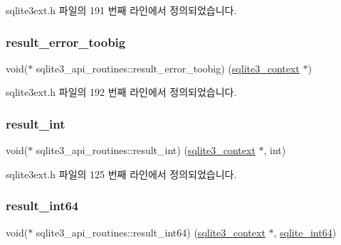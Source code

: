 sqlite3ext.\+h 파일의 191 번째 라인에서 정의되었습니다.

\mbox{\label{structsqlite3__api__routines_a8d8d0f8b76631dc4c976caf8e4b69714}} 
\subsubsection{\texorpdfstring{result\+\_\+error\+\_\+toobig}{result\_error\_toobig}}
{\footnotesize\ttfamily void($\ast$ sqlite3\+\_\+api\+\_\+routines\+::result\+\_\+error\+\_\+toobig) (\hyperlink{sqlite3_8h_a3b519553ffec8fc42b2356f5b1ebdc57}{sqlite3\+\_\+context} $\ast$)}



sqlite3ext.\+h 파일의 192 번째 라인에서 정의되었습니다.

\mbox{\label{structsqlite3__api__routines_ad1470bb8057593e97170b73b65a9e808}} 
\subsubsection{\texorpdfstring{result\+\_\+int}{result\_int}}
{\footnotesize\ttfamily void($\ast$ sqlite3\+\_\+api\+\_\+routines\+::result\+\_\+int) (\hyperlink{sqlite3_8h_a3b519553ffec8fc42b2356f5b1ebdc57}{sqlite3\+\_\+context} $\ast$, int)}



sqlite3ext.\+h 파일의 125 번째 라인에서 정의되었습니다.

\mbox{\label{structsqlite3__api__routines_ae24ce0ec8d90ac28a6a98cfafadaa7d0}} 
\subsubsection{\texorpdfstring{result\+\_\+int64}{result\_int64}}
{\footnotesize\ttfamily void($\ast$ sqlite3\+\_\+api\+\_\+routines\+::result\+\_\+int64) (\hyperlink{sqlite3_8h_a3b519553ffec8fc42b2356f5b1ebdc57}{sqlite3\+\_\+context} $\ast$, \hyperlink{sqlite3_8h_a520a95f9080c018b2fade39885bd2e2a}{sqlite\+\_\+int64})}



